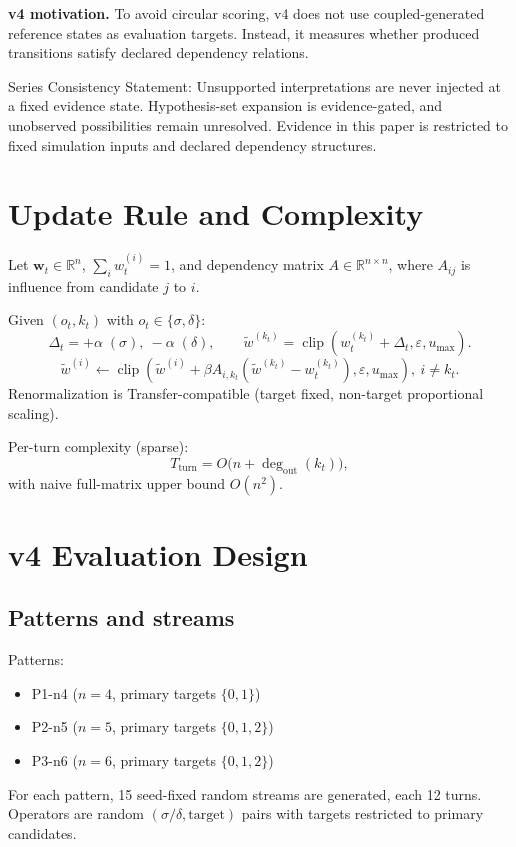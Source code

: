 \documentclass[11pt,a4paper]{article}
\begin{document}
\textbf{v4 motivation.}
To avoid circular scoring, v4 does not use coupled-generated reference states as evaluation targets. Instead, it measures whether produced transitions satisfy declared dependency relations.

Series Consistency Statement: Unsupported interpretations are never injected at a fixed evidence state. Hypothesis-set expansion is evidence-gated, and unobserved possibilities remain unresolved. Evidence in this paper is restricted to fixed simulation inputs and declared dependency structures.

\section{Update Rule and Complexity}
Let \(\mathbf{w}_t\in\mathbb{R}^n\), \(\sum_i w_t^{(i)}=1\), and dependency matrix \(A\in\mathbb{R}^{n\times n}\), where \(A_{ij}\) is influence from candidate \(j\) to \(i\).

Given \((o_t,k_t)\) with \(o_t\in\{\sigma,\delta\}\):
\[
\Delta_t = +\alpha\;(\sigma),\ -\alpha\;(\delta),\qquad
\tilde{w}^{(k_t)}=\operatorname{clip}(w_t^{(k_t)}+\Delta_t,\varepsilon,u_{\max}).
\]
\[
\tilde{w}^{(i)} \leftarrow \operatorname{clip}(\tilde{w}^{(i)}+\beta A_{i,k_t}(\tilde{w}^{(k_t)}-w_t^{(k_t)}),\varepsilon,u_{\max}),\ i\neq k_t.
\]
Renormalization is Transfer-compatible (target fixed, non-target proportional scaling).

Per-turn complexity (sparse):
\[
T_{\text{turn}}=O\big(n+\deg_{\text{out}}(k_t)\big),
\]
with naive full-matrix upper bound \(O(n^2)\).

\section{v4 Evaluation Design}
\subsection{Patterns and streams}
Patterns:
\begin{itemize}
  \item P1-n4 (\(n=4\), primary targets \(\{0,1\}\))
  \item P2-n5 (\(n=5\), primary targets \(\{0,1,2\}\))
  \item P3-n6 (\(n=6\), primary targets \(\{0,1,2\}\))
\end{itemize}
For each pattern, 15 seed-fixed random streams are generated, each 12 turns.
Operators are random \((\sigma/\delta,\text{target})\) pairs with targets restricted to primary candidates.
\end{document}
